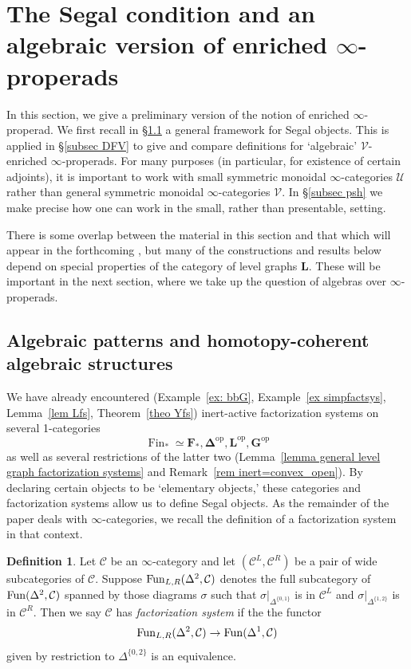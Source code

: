 \documentclass{amsart}
\numberwithin{theorem}{subsection}
\theoremstyle{definition}
\newtheorem{definition}[theorem]{Definition}
\providecommand{\op}{\mathrm{op}}
\newcommand{\finset}{\operatorname{Fin}}
\newcommand{\pfinset}{\finset_*}
\newcommand{\finsetskel}{\mathbf{F}}
\newcommand{\pfinsetskel}{\finsetskel_*}
\newcommand{\xcc}{\mathcal{C}}
\newcommand{\xU}{\mathcal{U}}
\newcommand{\xV}{\mathcal{V}}
\newcommand{\name}[1]{\ensuremath{\text{\textup{#1}}}}
\newcommand{\simp}{\mathbf{\Delta}}
\newcommand{\levelg}{\mathbf{L}}
\newcommand{\bbY}{\mathbf{G}}
\newcommand{\Fun}{\name{Fun}}
\begin{document}
\section{The Segal condition and an algebraic version of enriched \texorpdfstring{$\infty$}{∞}-properads}\label{sec segal presheaves}

In this section, we give a preliminary version of the notion of enriched $\infty$-properad.
We first recall in \S\ref{subsection hcas} a general framework for Segal objects.
This is applied in \S\ref{subsec DFV} to give and compare definitions for `algebraic' $\xV$-enriched $\infty$-properads.
For many purposes (in particular, for existence of certain adjoints), it is important to work with small symmetric monoidal $\infty$-categories $\xU$ rather than general symmetric monoidal $\infty$-categories $\xV$.
In \S\ref{subsec psh} we make precise how one can work in the small, rather than presentable, setting.

There is some overlap between the material in this section and that which will appear in the forthcoming \cite{patterns3}, but many of the constructions and results below depend on special properties of the category of level graphs $\levelg$. 
These will be important in the next section, where we take up the question of algebras over $\infty$-properads.


\subsection{Algebraic patterns and homotopy-coherent algebraic structures}\label{subsection hcas}
We have already encountered (Example~\ref{ex: bbG}, Example~\ref{ex simpfactsys}, Lemma~\ref{lem Lfs}, Theorem~\ref{theo Yfs}) inert-active factorization systems on several 1-categories
\[
\pfinset \simeq \pfinsetskel, \simp^\op, \levelg^\op, \bbY^\op
\]
as well as several restrictions of the latter two (Lemma~\ref{lemma general level graph factorization systems} and Remark~\ref{rem inert=convex_open}).
By declaring certain objects to be `elementary objects,' these categories and factorization systems allow us to define Segal objects.
As the remainder of the paper deals with $\infty$-categories, we recall the definition of a factorization system in that context.

\begin{definition}\label{definition inf cat factorization system}
	Let $\xcc$ be an $\infty$-category and let $(\xcc^{L}, \xcc^{R})$ be a pair of wide subcategories of $\xcc$. Suppose $\Fun_{L,R}(\Delta^{2},\xcc)$ denotes the full subcategory of $\Fun(\Delta^{2},\xcc)$ spanned by those diagrams $\sigma$ such that $\sigma|_{\Delta^{\{0,1\}}}$ is in $\xcc^{L}$ and $\sigma|_{\Delta^{\{1,2\}}}$ is in $\xcc^{R}$. Then we say $\xcc$ has \emph{factorization system} if the the functor
	\[ \Fun_{L,R}(\Delta^{2},\xcc) \to
	\Fun(\Delta^{1},\xcc) \] given by restriction to $\Delta^{\{0,2\}}$ is an equivalence.
\end{definition}
\end{document}
